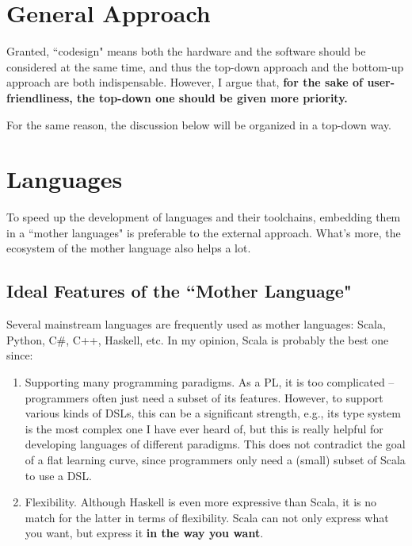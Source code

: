 \documentclass[11pt]{article}
\begin{document}
\section{General Approach}
Granted, ``codesign" means both the hardware and the software should be considered at the same time, and thus the top-down approach and the bottom-up approach are both indispensable.
However, I argue that, \textbf{for the sake of user-friendliness, the top-down one should be given more priority.}

For the same reason, the discussion below will be organized in a top-down way.

\section{Languages}
To speed up the development of languages and their toolchains, embedding them in a ``mother languages" is preferable to the external approach.
What's more, the ecosystem of the mother language also helps a lot.

\subsection{Ideal Features of the ``Mother Language"}
Several mainstream languages are frequently used as mother languages: Scala, Python, C\#, C++, Haskell, etc.
In my opinion, Scala is probably the best one since:
\begin{enumerate}
    \item Supporting many programming paradigms.
    As a PL, it is too complicated -- programmers often just need a subset of its features.
    However, to support various kinds of DSLs, this can be a significant strength, e.g., its type system is the most complex one I have ever heard of, but this is really helpful for developing languages of different paradigms.
    This does not contradict the goal of a flat learning curve, since programmers only need a (small) subset of Scala to use a DSL.
    \item Flexibility.
    Although Haskell is even more expressive than Scala, it is no match for the latter in terms of flexibility.
    Scala can not only express what you want, but express it \textbf{in the way you want}.
\end{enumerate}
\end{document}
